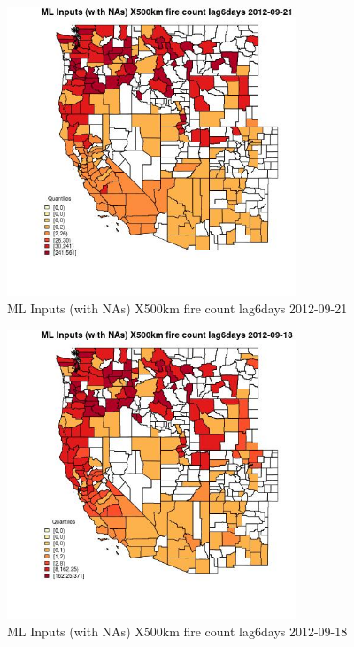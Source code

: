 \begin{figure} 
\centering  
\includegraphics[width=0.77\textwidth]{Code_Outputs/Report_ML_input_PM25_Step4_part_e_de_duplicated_aves_compiled_2019-05-14wNAs_CountyX500km_fire_count_lag6daysMean2012-09-21_2012-09-21.jpg} 
\caption{\label{fig:Report_ML_input_PM25_Step4_part_e_de_duplicated_aves_compiled_2019-05-14wNAsCountyX500km_fire_count_lag6daysMean2012-09-21_2012-09-21}ML Inputs (with NAs) X500km fire count lag6days 2012-09-21} 
\end{figure} 
 

\begin{figure} 
\centering  
\includegraphics[width=0.77\textwidth]{Code_Outputs/Report_ML_input_PM25_Step4_part_e_de_duplicated_aves_compiled_2019-05-14wNAs_CountyX500km_fire_count_lag6daysMean2012-09-18_2012-09-18.jpg} 
\caption{\label{fig:Report_ML_input_PM25_Step4_part_e_de_duplicated_aves_compiled_2019-05-14wNAsCountyX500km_fire_count_lag6daysMean2012-09-18_2012-09-18}ML Inputs (with NAs) X500km fire count lag6days 2012-09-18} 
\end{figure} 
 

